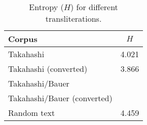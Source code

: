 \documentclass{scrarticle}
\begin{document}
\begin{table}[ht]
\center
\begin{tabular}{lr}
   \hline
   Corpus                        & \multicolumn{1}{c}{$H$}   \\
   \hline\hline
   Takahashi                     & 4.021                     \\
   Takahashi (converted)         & 3.866                     \\
   Takahashi/Bauer               &                           \\
   Takahashi/Bauer (converted)   &                           \\
   Random text                   & 4.459                     \\
   \hline
\end{tabular}
\caption{Entropy ($H$) for different transliterations.}
\label{tab:entropy}
\end{table}


\clearpage
\printbibliography
\end{document}
